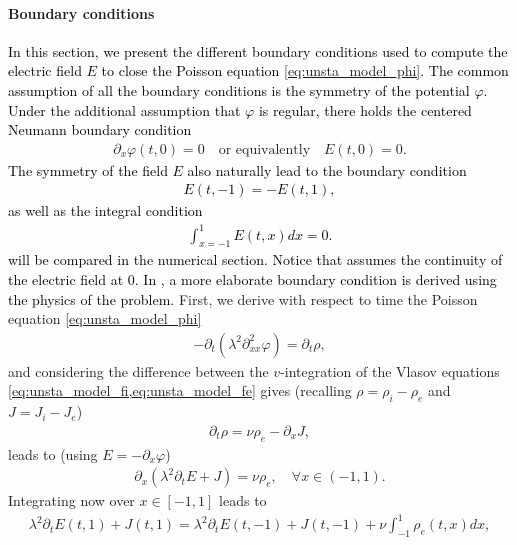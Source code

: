 \documentclass{article}
\numberwithin{equation}{section}
\begin{document}
 \paragraph{Boundary conditions}
 
 \textcolor{black}{In this section, we present the different boundary conditions used to compute the electric field $E$ to close the Poisson equation \cref{eq:unsta_model_phi}. The common assumption of all the boundary conditions is the symmetry of the potential $\varphi$. Under the additional assumption that $\varphi$ is regular, there holds the centered Neumann boundary condition}
 \begin{align}\label{eq:phi_bc_neumann}
 	\partial_x \varphi (t,0) = 0 \quad \text{or equivalently} \quad E(t,0) = 0.
 \end{align}
 \textcolor{black}{
 The symmetry of the field $E$ also naturally lead to the boundary condition 
 \begin{align}\label{eq:phi_bc_dirich}
 	E(t,-1) = - E(t,1),
 \end{align}
 as well as the integral condition
 \begin{align}
 \label{eq:phi_bc_integ}
 	\int_{x=-1}^1 E(t,x) dx = 0.
 \end{align}
  will be compared in the numerical section. Notice that  assumes the continuity of the electric field at 0. In \cite{manfredi_devaux}, a more elaborate boundary condition is derived using the physics of the problem. 
 }
First, we derive with respect to time the Poisson equation \cref{eq:unsta_model_phi}
\begin{align*}
	- \partial_t (\lambda^2\partial_{xx}^2 \varphi) = \partial_t \rho, 	
\end{align*}
and considering the difference between the $v$-integration of the Vlasov equations \cref{eq:unsta_model_fi,eq:unsta_model_fe} gives (recalling $\rho=\rho_i-\rho_e$ and $J=J_i-J_e$) 
\begin{align*}
	\partial_t \rho = \nu \rho_e - \partial_x J,
\end{align*}
leads to (using $E=-\partial_x \varphi$) 
\begin{align*}
	\partial_x (\lambda^2\partial_t E + J) = \nu \rho_e, \quad \forall x\in (-1, 1). 	
\end{align*}
Integrating now over $x\in[-1, 1]$ leads to 
\begin{align}\label{eq:ampere_integ}
	\lambda^2\partial_t E(t, 1) + J(t, 1) = \lambda^2\partial_t E(t, -1) + J(t, -1) +\nu \int_{-1}^1 \rho_e (t, x) dx,  
\end{align}
\end{document}
